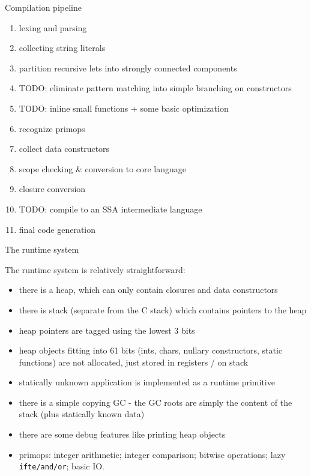 \documentclass{beamer}
\begin{document}

\begin{frame}{Compilation pipeline}

\begin{enumerate}
\item lexing and parsing
\item collecting string literals
\item partition recursive lets into strongly connected components
\item TODO: eliminate pattern matching into simple branching on constructors
\item TODO: inline small functions + some basic optimization
\item recognize primops
\item collect data constructors
\item scope checking \& conversion to core language
\item closure conversion
\item TODO: compile to an SSA intermediate language
\item final code generation 
\end{enumerate}

\end{frame}


\begin{frame}{The runtime system}

The runtime system is relatively straightforward:

{\small
\begin{itemize}
\item there is a heap, which can only contain closures and data constructors
\item there is stack (separate from the C stack) which contains pointers to the heap
\item heap pointers are tagged using the lowest 3 bits
\item heap objects fitting into 61 bits (ints, chars, nullary constructors, static functions) are
      not allocated, just stored in registers / on stack
\item statically unknown application is implemented as a runtime primitive 
\item there is a simple copying GC - the GC roots are simply the content of the stack
      (plus statically known data)
\item there are some debug features like printing heap objects
\item primops: integer arithmetic; integer comparison; bitwise operations; lazy {\tt ifte/and/or}; basic IO.
\end{itemize}
}

\end{frame}
\end{document}
